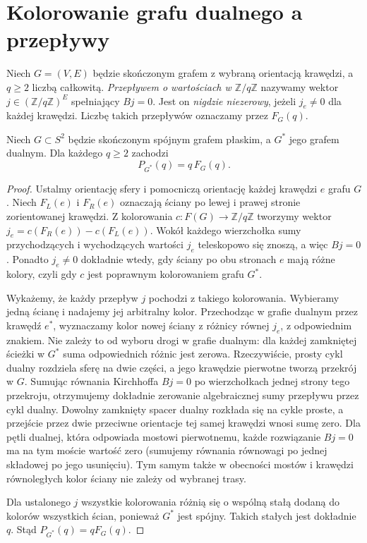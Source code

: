 \section{Kolorowanie grafu dualnego a przepływy}
\label{sec:tg-flows-duality}

\begin{definicja}
Niech $G=(V,E)$ będzie skończonym grafem z wybraną
orientacją krawędzi, a $q\ge2$ liczbą całkowitą.
\emph{Przepływem o wartościach w $\mathbb Z/q\mathbb Z$}
nazywamy wektor $j\in(\mathbb Z/q\mathbb Z)^E$
spełniający $Bj=0$. Jest on \emph{nigdzie niezerowy}, jeżeli
$j_e\ne0$ dla każdej krawędzi. Liczbę takich przepływów
oznaczamy przez $F_G(q)$.
\end{definicja}

\begin{twierdzenie}
\label{thm:tg-flow-color-dual}
Niech $G\subset S^2$ będzie skończonym spójnym grafem płaskim,
a $G^*$ jego grafem dualnym. Dla każdego $q\ge2$ zachodzi
\[
 P_{G^*}(q)=q\,F_G(q).
\]
\end{twierdzenie}

\begin{proof}
Ustalmy orientację sfery i pomocniczą orientację każdej
krawędzi $e$ grafu $G$. Niech $F_L(e)$ i $F_R(e)$ oznaczają
ściany po lewej i prawej stronie zorientowanej krawędzi.
Z kolorowania $c:F(G)\to\mathbb Z/q\mathbb Z$ tworzymy
wektor $j_e=c(F_R(e))-c(F_L(e))$.
Wokół każdego wierzchołka sumy przychodzących i wychodzących
wartości $j_e$ teleskopowo się znoszą, a więc $Bj=0$.
Ponadto $j_e\ne0$ dokładnie wtedy, gdy ściany po obu
stronach $e$ mają różne kolory, czyli gdy $c$ jest
poprawnym kolorowaniem grafu $G^*$.

Wykażemy, że każdy przepływ $j$ pochodzi z takiego
kolorowania. Wybieramy jedną ścianę i nadajemy jej
arbitralny kolor. Przechodząc w grafie dualnym przez
krawędź $e^*$, wyznaczamy kolor nowej ściany
z różnicy równej $j_e$, z odpowiednim znakiem.
Nie zależy to od wyboru drogi w grafie dualnym:
dla każdej zamkniętej ścieżki w $G^*$ suma odpowiednich
różnic jest zerowa. Rzeczywiście, prosty cykl dualny
rozdziela sferę na dwie części, a jego krawędzie
pierwotne tworzą przekrój w $G$. Sumując równania
Kirchhoffa $Bj=0$ po wierzchołkach jednej strony
tego przekroju, otrzymujemy dokładnie zerowanie
algebraicznej sumy przepływu przez cykl dualny.
Dowolny zamknięty spacer dualny rozkłada się na cykle
proste, a przejście przez dwie przeciwne orientacje tej
samej krawędzi wnosi sumę zero. Dla pętli dualnej,
która odpowiada mostowi pierwotnemu, każde rozwiązanie
$Bj=0$ ma na tym moście wartość zero (sumujemy równania
równowagi po jednej składowej po jego usunięciu).
Tym samym także w obecności mostów i krawędzi
równoległych kolor ściany nie zależy od wybranej trasy.

Dla ustalonego $j$ wszystkie kolorowania różnią się
o wspólną stałą dodaną do kolorów wszystkich ścian,
ponieważ $G^*$ jest spójny. Takich stałych jest dokładnie
$q$. Stąd $P_{G^*}(q)=qF_G(q)$.
\end{proof}

